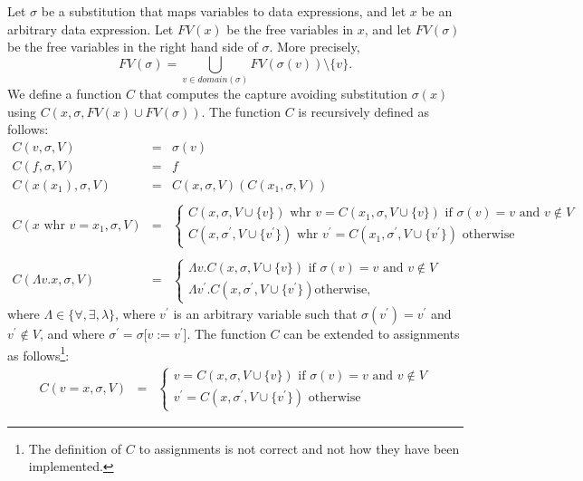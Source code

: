 \documentclass{article}
\begin{document}
Let $\sigma $ be a substitution that maps variables to data expressions, and
let $x$ be an arbitrary data expression. Let $FV(x)$ be the free variables
in $x$, and let $FV(\sigma )$ be the free variables in the right hand side
of $\sigma $. More precisely,%
\[
FV(\sigma )=\bigcup_{v\in \mathit{domain}(\sigma )}FV(\sigma (v))\setminus \{v\}.
\]%
We define a function $C$ that computes the capture avoiding substitution $%
\sigma (x)$ using $C(x,\sigma ,FV(x)\cup FV(\sigma ))$. The function $C$ is
recursively defined as follows:%
\[
\begin{array}{lll}
C(v,\sigma ,V) & = & \sigma (v) \\
C(f,\sigma ,V) & = & f \\
C(x(x_{1}),\sigma ,V) & = & C(x,\sigma ,V)(C(x_{1},\sigma ,V)) \\
&  &  \\
C(x\text{ whr }v=x_{1},\sigma ,V) & = & \left\{
\begin{array}{l}
C(x,\sigma ,V\cup \{v\})\text{ whr }v=C(x_{1},\sigma ,V\cup \{v\})\text{ if }%
\sigma (v)=v\text{ and }v\notin V \\
C(x,\sigma ^{\prime },V\cup \{v^{\prime }\})\text{ whr }v^{\prime
}=C(x_{1},\sigma ^{\prime },V\cup \{v^{\prime }\})\text{ otherwise}%
\end{array}%
\right.  \\
&  &  \\
C(\Lambda v.x,\sigma ,V) & = & \left\{
\begin{array}{l}
\Lambda v.C(x,\sigma ,V\cup \{v\})\text{ if }\sigma (v)=v\text{ and }v\notin
V \\
\Lambda v^{\prime }.C(x,\sigma ^{\prime },V\cup \{v^{\prime }\})\text{
otherwise,}%
\end{array}%
\right.
\end{array}%
\]%
where $\Lambda \in \{\forall ,\exists ,\lambda \}$, where $v^{\prime }$ is
an arbitrary variable such that $\sigma (v^{\prime })=v^{\prime }$ and $%
v^{\prime }\notin V$, and where $\sigma ^{\prime }=\sigma \lbrack
v:=v^{\prime }]$. The function $C$ can be extended to assignments as follows\footnote{The 
definition of $C$ to assignments is not correct and not how they have been implemented.}:
%
\[
\begin{array}{lll}
C(v=x,\sigma ,V) & = & \left\{
\begin{array}{l}
v=C(x,\sigma ,V\cup \{v\})\text{ if }\sigma (v)=v\text{ and }v\notin V \\
v^{\prime }=C(x,\sigma ^{\prime },V\cup \{v^{\prime }\})\text{ otherwise}%
\end{array}%
\right.
\end{array}%
\]
\end{document}
